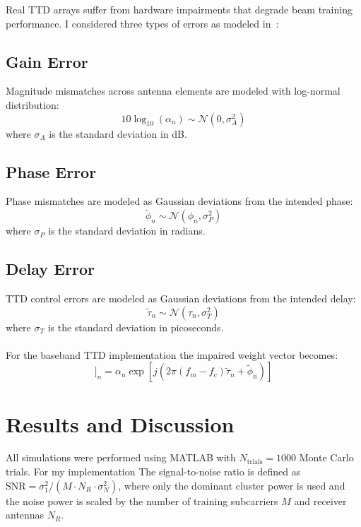 \documentclass[12pt,letterpaper]{article}
\begin{document}
Real TTD arrays suffer from hardware impairments that degrade beam training performance. I considered three types of errors as modeled in~\cite{boljanovic2020design}:

\subsection{Gain Error}
Magnitude mismatches across antenna elements are modeled with log-normal distribution:
\begin{equation}
10\log_{10}(\alpha_n) \sim \mathcal{N}(0, \sigma_A^2)
\end{equation}
where $\sigma_A$ is the standard deviation in dB.

\subsection{Phase Error}
Phase mismatches are modeled as Gaussian deviations from the intended phase:
\begin{equation}
\tilde{\phi}_n \sim \mathcal{N}(\phi_n, \sigma_P^2)
\end{equation}
where $\sigma_P$ is the standard deviation in radians.

\subsection{Delay Error}
TTD control errors are modeled as Gaussian deviations from the intended delay:
\begin{equation}
\tilde{\tau}_n \sim \mathcal{N}(\tau_n, \sigma_T^2)
\end{equation}
where $\sigma_T$ is the standard deviation in picoseconds.
\\ \\
For the baseband TTD implementation the impaired weight vector becomes:
\begin{equation}
[\mathbf{w}_{\text{BB}}[m]]_n = \alpha_n \exp[j(2\pi(f_m - f_c)\tilde{\tau}_n + \tilde{\phi}_n)]
\end{equation}

\section{Results and Discussion}

All simulations were performed using MATLAB with $N_{\text{trials}} = 1000$ Monte Carlo trials. For my implementation The signal-to-noise ratio is defined as $\text{SNR} = \sigma_1^2 / (M \cdot N_R \cdot \sigma_N^2)$, where only the dominant cluster power is used and the noise power is scaled by the number of training subcarriers $M$ and receiver antennas $N_R$.
\end{document}
